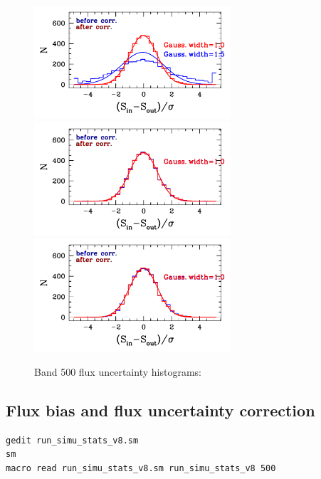 \documentclass[11pt,a4paper]{article}
\begin{document}
\begin{figure}[H]
	\caption{
		Band 500 flux uncertainty histograms:
	}
	\includegraphics[width=0.65\textwidth]{galsim_500_hist_dfcorr_1}
	\includegraphics[width=0.65\textwidth]{galsim_500_hist_dfcorr_2}
	\includegraphics[width=0.65\textwidth]{galsim_500_hist_dfcorr_3}
\end{figure}


\subsection{Flux bias and flux uncertainty correction}
\label{Band500_dfcorr}

\begin{lstlisting}[language=bash]
gedit run_simu_stats_v8.sm
sm
macro read run_simu_stats_v8.sm run_simu_stats_v8 500
\end{lstlisting}


\clearpage
\end{document}
